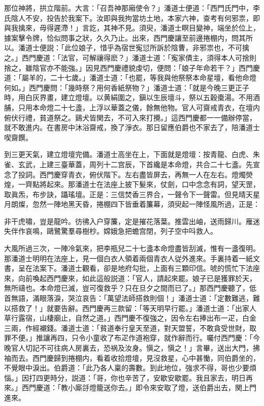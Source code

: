 那位神將，拱立階前。大言：「召吾神那廂使令？」潘道士便道：「西門氏門中，李氏陰人不安，投告於我案下。汝即與我拘當坊土地，本家六神，查考有何邪祟，即與我擒來，毋得遲滯！」言訖，其神不見。須臾，潘道士瞑目變神，端坐於位上，據案擊令牌，恰似問事之狀，久久乃止。出來，西門慶讓至前邊捲棚内，問其所以。潘道士便説：「此位娘子，惜乎為宿世寃愆所訴於陰曹，非邪祟也，不可擒之。」西門慶道：「法官，可解禳得麽？」潘道士道：「寃家債主，須得本人可捨則捨之，雖陰官亦不能強。」因見西門慶禮貌虔切，便問：「娘子年命若干？」西門慶道：「屬羊的，二十七歲。」潘道士道：「也罷，等我與他祭祭本命星壇，看他命燈何如。」西門慶問：「幾時祭？用何香紙祭物？」潘道士道：「就是今晚三更正子時，用白灰界畫，建立燈壇。以黄絹圍之，鎭以生辰壇斗，祭以五穀棗湯。不用酒脯，只用本命燈二十七盞，上浮以華蓋之儀，餘無他物。官人可齋戒青衣，在壇内俯伏行禮，貧道祭之。鷄犬皆関去，不可入來打攪。」這西門慶都一一備辦停當，就不敢進内。在書房中沐浴齋戒，換了淨衣。那日留應伯爵也不家去了，陪潘道士喫齋饌。

到三更天氣，建立燈壇完備。潘道士高坐在上，下面就是燈壇：按青龍、白虎、朱雀、玄武，上建三臺華蓋，周列十二宫辰，下首纔是本命燈，共合二十七盞。先宣念了投詞。西門慶穿青衣，俯伏階下。左右盡皆屏去，再無一人在左右。燈燭熒煌，一齊點將起來。那潘道士在法座上披下髮來，仗劍，口中念念有詞，望天罡，取眞炁，布步訣，躡瑤壇。正是：三信焚香三界合，一聲令下一聲雷。但見晴天星月朗燦，忽然一陣地黑天昏，捲棚四下皆垂着簾幕，須臾起一陣怪風所過，正是：

\begin{myquote}
非干虎嘯，豈是龍吟。彷彿入户穿簾，定是摧花落葉。推雲出岫，送雨歸川。雁迷失伴作哀鳴，鷗鷺驚羣尋樹杪。嫦娥急把蟾宫閉，列子空中呌救人。
\end{myquote}

大風所過三次，一陣冷氣來，把李瓶兒二十七盞本命燈盡皆刮滅，惟有一盞復明。那潘道士明明在法座上，見一個白衣人領着兩個青衣人従外進來。手裏持着一紙文書，呈在法案下。潘道士觀看，卻是地府勾批，上面有三顆印信。唬的慌忙下法座來，向前喚起西門慶來，如此這般説道：「官人，請起來罷。娘子已是獲罪於天，無所禱也。本命燈已滅，豈可復救乎？只在旦夕之間而已了。」那西門慶聽了，低首無語，滿眼落淚，哭泣哀告：「萬望法師搭救則個！」潘道士道：「定數難逃，難以搭救了！」就要告辭。西門慶再三款留：「等天明早行罷。」潘道士道：「出家人草行露宿，山棲廟止，自然之道。」西門慶不復強之，因令左右捧出布一疋，白金三兩，作經襯錢。潘道士道：「貧道奉行皇天至道，對天盟誓，不敢貪受世財，取罪不便。」推讓再四，只令小童收了布疋作道袍穿，就作辭而行。囑付西門慶：「今晚官人切記不可往病人房裏去，恐祸及汝身。愼之，愼之！」言畢，送出大門，拂袖而去。西門慶歸到捲棚内，看着收拾燈壇，見沒救星，心中甚慟，同伯爵坐的，不覺眼中淚出。伯爵道：「此乃各人稟的壽數。到此地位，強求不得，哥也少要煩惱。」因打四更時分，説道：「哥，你也辛苦了，安歇安歇罷。我且家去，明日再來。」西門慶道：「教小廝㧱燈籠送你去。」即令來安取了燈，送伯爵出去，関上門進來。


